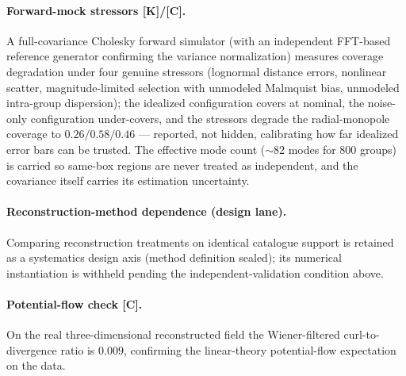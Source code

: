 \documentclass[10pt]{article}
\theoremstyle{definition}
\newcommand{\tier}[1]{\textbf{[#1]}}
\begin{document}
\paragraph{Forward-mock stressors \tier{K}/\tier{C}.}
A full-covariance Cholesky forward simulator (with an independent
FFT-based reference generator confirming the variance normalization)
measures coverage degradation under four genuine stressors (lognormal
distance errors, nonlinear scatter, magnitude-limited selection with
unmodeled Malmquist bias, unmodeled intra-group dispersion); the
idealized configuration covers at nominal, the noise-only
configuration under-covers, and the stressors degrade the
radial-monopole coverage to $0.26/0.58/0.46$ --- reported, not
hidden, calibrating how far idealized error bars can be trusted. The
effective mode count (${\sim}82$ modes for 800 groups) is carried so
same-box regions are never treated as independent, and the covariance
itself carries its estimation uncertainty.

\paragraph{Reconstruction-method dependence (design lane).}
Comparing reconstruction treatments on identical catalogue support is
retained as a systematics design axis (method definition sealed); its
numerical instantiation is withheld pending the independent-validation
condition above.

\paragraph{Potential-flow check \tier{C}.}
On the real three-dimensional reconstructed field the Wiener-filtered
curl-to-divergence ratio is $0.009$, confirming the linear-theory
potential-flow expectation on the data.
\end{document}
